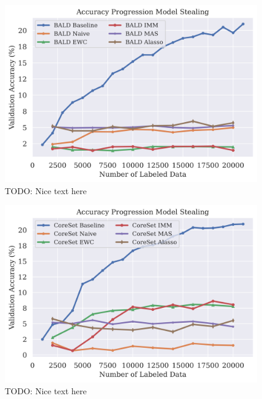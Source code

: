 \begin{figure}[h]
    \centering
    \includegraphics[width=0.8\linewidth]{images/results_CALMS/cifar100_label_bald.png}
    \caption[Accuracy Comparison for Model Stealing on CIFAR100 using the top1-label and the Active Learning strategy BALD]{TODO: Nice text here}
    \label{fig:CALMSCIFAR100LabelBALD}
\end{figure}

\begin{figure}[h]
    \centering
    \includegraphics[width=0.8\linewidth]{images/results_CALMS/cifar100_label_coreset.png}
    \caption[Accuracy Comparison for Model Stealing on CIFAR100 using the top1-label and the Active Learning strategy CoreSet]{TODO: Nice text here}
    \label{fig:CALMSCIFAR100LabelCoreSet}
\end{figure}


